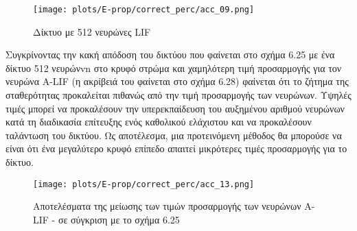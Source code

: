 \documentclass[12pt]{report}
\begin{document}
\begin{figure}[htp] %
    \centering
     \texttt{[image: plots/E-prop/correct\_perc/acc\_09.png]}
    \caption{Δίκτυο με 512 νευρώνες \textlatin{LIF}}
    \label{fig:representation-methods}
\end{figure}

Συγκρίνοντας την κακή απόδοση του δικτύου που φαίνεται στο σχήμα 6.25 με ένα δίκτυο 512 νευρώνvn στο κρυφό στρώμα και χαμηλότερη τιμή προσαρμογής για τον νευρώνα \textlatin{A-LIF} (η ακρίβειά του φαίνεται στο σχήμα 6.28) φαίνεται ότι το ζήτημα της σταθερότητας προκαλείται πιθανώς από την τιμή προσαρμογής των νευρώνων. Υψηλές τιμές μπορεί να προκαλέσουν την υπερεκπαίδευση του αυξημένου αριθμού νευρώνων κατά τη διαδικασία επίτευξης ενός καθολικού ελάχιστου και να προκαλέσουν ταλάντωση του δικτύου. Ως αποτέλεσμα, μια προτεινόμενη μέθοδος θα μπορούσε να είναι ότι ένα μεγαλύτερο κρυφό επίπεδο απαιτεί μικρότερες τιμές προσαρμογής για το δίκτυο.

\begin{figure}[htp] %
    \centering
     \texttt{[image: plots/E-prop/correct\_perc/acc\_13.png]}
    \caption{Αποτελέσματα της μείωσης των τιμών προσαρμογής των νευρώνων \textlatin{A-LIF} - σε σύγκριση με το σχήμα 6.25}
    \label{fig:representation-methods}
\end{figure}
\end{document}
